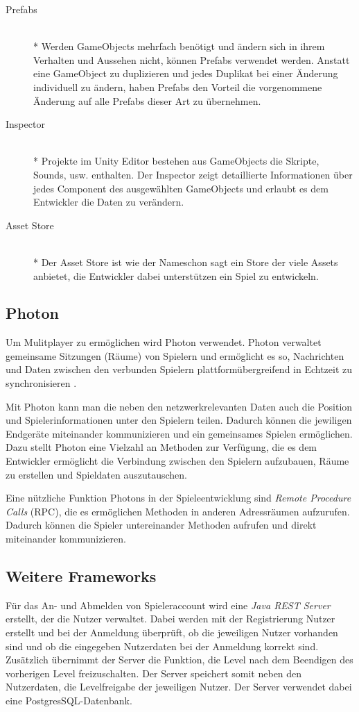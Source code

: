 \begin{description}
    \item[Prefabs] \hfill \\* Werden GameObjects mehrfach benötigt und ändern sich in ihrem Verhalten und Aussehen nicht, können Prefabs verwendet werden. Anstatt eine GameObject zu duplizieren und jedes Duplikat bei einer Änderung individuell zu ändern, haben Prefabs den Vorteil die vorgenommene Änderung auf alle Prefabs dieser Art zu übernehmen.
    \item[Inspector] \hfill \\* Projekte im Unity Editor bestehen aus GameObjects die Skripte, Sounds, usw. enthalten. Der Inspector zeigt detaillierte Informationen über jedes Component des ausgewählten GameObjects und erlaubt es dem Entwickler die Daten zu verändern.
    \item[Asset Store] \hfill \\* Der Asset Store ist wie der Nameschon sagt ein Store der viele Assets anbietet, die Entwickler dabei unterstützen ein Spiel zu entwickeln.
\end{description}


\subsection{Photon}
\label{subsec:realisierung:technologien:photon}
Um Mulitplayer zu ermöglichen wird Photon verwendet. Photon verwaltet gemeinsame Sitzungen (Räume) von Spielern und ermöglicht es so, Nachrichten und Daten zwischen den verbunden Spielern plattformübergreifend in Echtzeit zu synchronisieren \cite{photon}.

Mit Photon kann man die neben den netzwerkrelevanten Daten auch die Position und Spielerinformationen unter den Spielern teilen. Dadurch können die jewiligen Endgeräte miteinander kommunizieren und ein gemeinsames Spielen ermöglichen. Dazu stellt Photon eine Vielzahl an Methoden zur Verfügung, die es dem Entwickler ermöglicht die Verbindung zwischen den Spielern aufzubauen, Räume zu erstellen und Spieldaten auszutauschen.

Eine nützliche Funktion Photons in der Spieleentwicklung sind \textit{Remote Procedure Calls} (RPC), die es ermöglichen Methoden in anderen Adressräumen aufzurufen. Dadurch können die Spieler untereinander Methoden aufrufen und direkt miteinander kommunizieren.

\subsection{Weitere Frameworks}
\label{subsec:realisierung:technologien:frameworks}
Für das An- und Abmelden von Spieleraccount wird eine \textit{Java REST Server} erstellt, der die Nutzer verwaltet. Dabei werden mit der Registrierung Nutzer erstellt und bei der Anmeldung überprüft, ob die jeweiligen Nutzer vorhanden sind und ob die eingegeben Nutzerdaten bei der Anmeldung korrekt sind. Zusätzlich übernimmt der Server die Funktion, die Level nach dem Beendigen des vorherigen Level freizuschalten. Der Server speichert somit neben den Nutzerdaten, die Levelfreigabe der jeweiligen Nutzer. Der Server verwendet dabei eine PostgresSQL-Datenbank.

